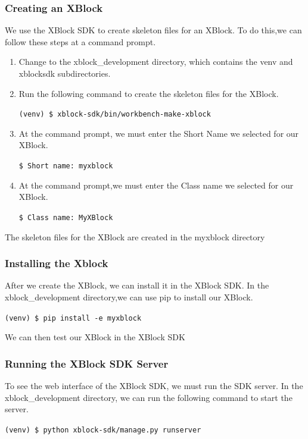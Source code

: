 \subsubsection{Creating an XBlock}
We use the XBlock SDK to create skeleton files for an XBlock. To do this,we can follow
these steps at a command prompt.
\begin{enumerate}
\item Change to the xblock\_development directory, which contains the venv and xblocksdk
subdirectories.
\item Run the following command to create the skeleton files for the XBlock.
\begin{center}\verb=(venv) $ xblock-sdk/bin/workbench-make-xblock=\end{center}
\item At the command prompt, we must enter the Short Name we selected for our XBlock.
\begin{center}\verb=$ Short name: myxblock=\end{center}
\item At the command prompt,we must enter the Class name we selected for our XBlock.
\begin{center}\verb=$ Class name: MyXBlock=\end{center}
\end{enumerate}
The skeleton files for the XBlock are created in the myxblock directory

\subsubsection{Installing the Xblock}

After we create the XBlock, we can install it in the XBlock SDK.
In the xblock\_development directory,we can use pip to install our XBlock.
\begin{center}\verb=(venv) $ pip install -e myxblock=\end{center}
We can then test our XBlock in the XBlock SDK

\subsubsection{Running the XBlock SDK Server}
To see the web interface of the XBlock SDK, we must run the SDK server.
In the xblock\_development directory, we can run the following command to start
the server.
\begin{center}\verb=(venv) $ python xblock-sdk/manage.py runserver=\end{center}

